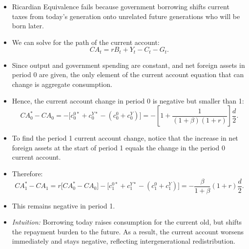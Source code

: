 \documentclass[12pt]{article}
\begin{document}
\begin{itemize}
  \item Ricardian Equivalence fails because government borrowing shifts current taxes from today’s generation onto unrelated future generations who will be born later.

  \item We can solve for the path of the current account:
  \[
  CA_{t} = rB_{t} + Y_{t} - C_{t} - G_{t}.
  \]

  \item Since output and government spending are constant, and net foreign assets in period 0 are given, the only element of the current account equation that can change is aggregate consumption.

  \item Hence, the current account change in period 0 is negative but smaller than 1:
  \[
  CA_{0}^{*} - CA_{0} = -\big[c_{0}^{0*} + c_{0}^{Y*} - (c_{0}^{0} + c_{0}^{Y})\big] 
  = -\left[1 + \frac{1}{(1+\beta)(1+r)}\right]\frac{d}{2}.
  \]

  \item To find the period 1 current account change, notice that the increase in net foreign assets at the start of period 1 equals the change in the period 0 current account.

  \item Therefore:
  \[
  CA_{1}^{*} - CA_{1} 
  = r\big[CA_{0}^{*} - CA_{0}\big] - \big[c_{1}^{0*} + c_{1}^{Y*} - (c_{1}^{0} + c_{1}^{Y})\big] 
  = -\frac{\beta}{1+\beta}(1+r)\frac{d}{2}.
  \]

  \item This remains negative in period 1.

  \item \textit{Intuition:} Borrowing today raises consumption for the current old, but shifts the repayment burden to the future. As a result, the current account worsens immediately and stays negative, reflecting intergenerational redistribution.
\end{itemize}
\end{document}
